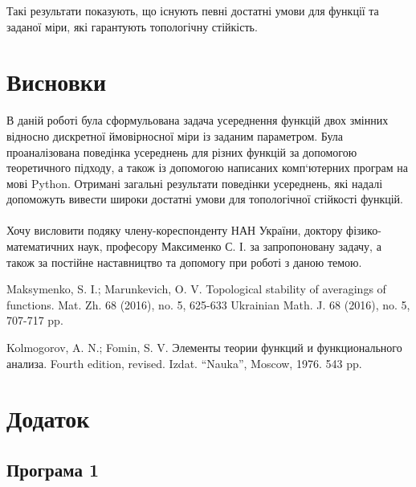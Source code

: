 \documentclass[12pt]{article}
\begin{document}
Такі результати показують, що існують певні достатні умови для функції та заданої міри, які гарантують топологічну стійкість.


\newpage
	\section{Висновки}	
	
В даній роботі була сформульована задача усереднення функцій двох змінних відносно дискретної ймовірносної міри із заданим параметром. Була проаналізована поведінка усереднень для різних функцій за допомогою теоретичного підходу, а також із допомогою написаних комп`ютерних програм на мові Python. Отримані загальні результати поведінки усереднень, які надалі допоможуть вивести широки достатні умови для топологічної стійкості функцій.
\\
\\
Хочу висловити подяку члену-кореспонденту НАН України, доктору фізико-математичних наук, професору Максименко С. І. за запропоновану задачу, а також за постійне наставництво та допомогу при роботі з даною темою.
	

	\begin{thebibliography}{99}
		
		Maksymenko, S. I.; Marunkevich, O. V. Topological stability of averagings of functions. Mat. Zh. 68 (2016), no. 5, 625-633 Ukrainian Math. J. 68 (2016), no. 5, 707-717 pp.
		
		Kolmogorov, A. N.; Fomin, S. V. Элементы теории функций и функционального анализа. Fourth edition, revised. Izdat. ``Nauka'', Moscow, 1976. 543 pp.
		

	\end{thebibliography}

\newpage
\section*{Додаток}

\subsection{Програма 1}
	
\end{document}
